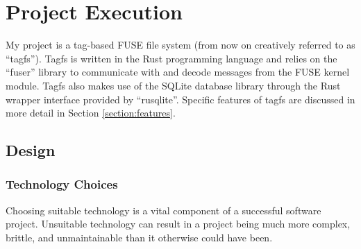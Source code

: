 \chapter{Project Execution}
\vspace{1cm}

My project is a tag-based FUSE file system (from now on creatively referred to
as ``tagfs''). Tagfs is written in the Rust programming language and relies on
the ``fuser'' library to communicate with and decode messages from the FUSE
kernel module. Tagfs also makes use of the SQLite database library through the
Rust wrapper interface provided by ``rusqlite''. Specific features of tagfs are
discussed in more detail in Section \ref{section:features}. 

\section{Design}


\subsection{Technology Choices}

Choosing suitable technology is a vital component of a successful software
project. Unsuitable technology can result in a project being much more complex,
brittle, and unmaintainable than it otherwise could have been. 

